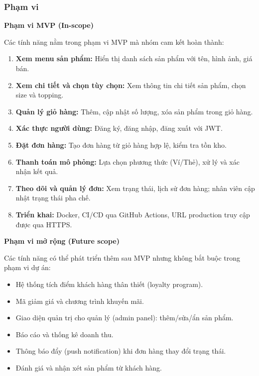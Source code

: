 \documentclass[a4paper]{article}
\begin{document}
\subsubsection{Phạm vi}

\noindent\textbf{Phạm vi MVP (In-scope)}

Các tính năng nằm trong phạm vi MVP mà nhóm cam kết hoàn thành:

\begin{enumerate}
    \item \textbf{Xem menu sản phẩm:} Hiển thị danh sách sản phẩm với tên, hình ảnh, giá bán.
    \item \textbf{Xem chi tiết và chọn tùy chọn:} Xem thông tin chi tiết sản phẩm, chọn size và topping.
    \item \textbf{Quản lý giỏ hàng:} Thêm, cập nhật số lượng, xóa sản phẩm trong giỏ hàng.
    \item \textbf{Xác thực người dùng:} Đăng ký, đăng nhập, đăng xuất với JWT.
    \item \textbf{Đặt đơn hàng:} Tạo đơn hàng từ giỏ hàng hợp lệ, kiểm tra tồn kho.
    \item \textbf{Thanh toán mô phỏng:} Lựa chọn phương thức (Ví/Thẻ), xử lý và xác nhận kết quả.
    \item \textbf{Theo dõi và quản lý đơn:} Xem trạng thái, lịch sử đơn hàng; nhân viên cập nhật trạng thái pha chế.
    \item \textbf{Triển khai:} Docker, CI/CD qua GitHub Actions, URL production truy cập được qua HTTPS.
\end{enumerate}

\noindent\textbf{Phạm vi mở rộng (Future scope)}

Các tính năng có thể phát triển thêm sau MVP nhưng không bắt buộc trong phạm vi dự án:

\begin{itemize}
    \item Hệ thống tích điểm khách hàng thân thiết (loyalty program).
    \item Mã giảm giá và chương trình khuyến mãi.
    \item Giao diện quản trị cho quản lý (admin panel): thêm/sửa/ẩn sản phẩm.
    \item Báo cáo và thống kê doanh thu.
    \item Thông báo đẩy (push notification) khi đơn hàng thay đổi trạng thái.
    \item Đánh giá và nhận xét sản phẩm từ khách hàng.
\end{itemize}
\end{document}
